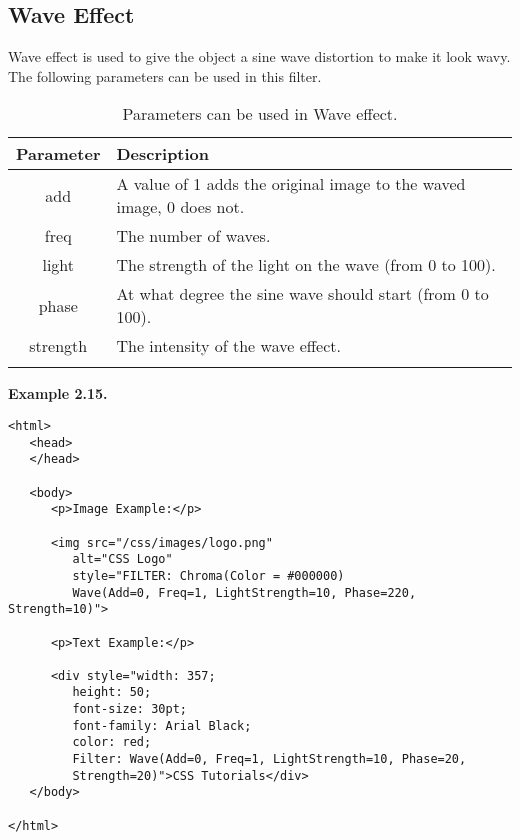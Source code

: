 \documentclass[a4paper,oneside]{book}
\numberwithin{equation}{chapter}
\begin{document}
\subsection{Wave Effect}
Wave effect is used to give the object a sine wave distortion to make it look wavy. The following parameters can be used in this filter.
\begin{center}
\begin{longtable}{|c|p{9cm}|}
\hline
\textbf{Parameter} & \textbf{Description}\\
\hline
add & A value of 1 adds the original image to the waved image, 0 does not.\\
\hline
freq & The number of waves.\\
\hline
light & The strength of the light on the wave (from 0 to 100).\\
\hline
phase & At what degree the sine wave should start (from 0 to 100).\\
\hline
strength & The intensity of the wave effect.\\
\hline
\caption{Parameters can be used in Wave effect.}
\end{longtable}
\end{center}
\textbf{Example 2.15.} 
\begin{verbatim}
<html>
   <head>
   </head>
   
   <body>
      <p>Image Example:</p>
      
      <img src="/css/images/logo.png" 
         alt="CSS Logo" 
         style="FILTER: Chroma(Color = #000000) 
         Wave(Add=0, Freq=1, LightStrength=10, Phase=220, Strength=10)">
      
      <p>Text Example:</p>
      
      <div style="width: 357; 
         height: 50; 
         font-size: 30pt; 
         font-family: Arial Black; 
         color: red; 
         Filter: Wave(Add=0, Freq=1, LightStrength=10, Phase=20, 
         Strength=20)">CSS Tutorials</div>
   </body>
   
</html>
\end{verbatim}
\end{document}
